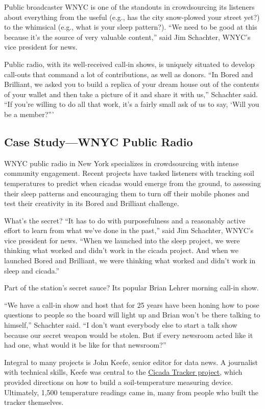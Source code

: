 \documentclass[notoc, symmetric, nobib, nols]{towcenter-guideto-book}
\begin{document}
Public broadcaster WNYC is one of the standouts in crowdsourcing its listeners about everything from the useful (e.g., has the city snow-plowed your street yet?) to the whimsical (e.g., what is your sleep pattern?).
``We need to be good at this because it's the source of very valuable content,'' said Jim Schachter, WNYC's vice president for news.%

Public radio, with its well-received call-in shows, is uniquely situated to develop call-outs that command a lot of contributions, as well as donors. ``In Bored and Brilliant, we asked you to build a replica of your dream house out of the contents of your wallet and then take a picture of it and share it with us,'' Schachter said. ``If you're willing to do all that work, it's a fairly small ask of us to say, ‘Will you be a member?'''


\subsection{Case Study---WNYC Public Radio}

WNYC public radio in New York specializes in crowdsourcing with intense community engagement. Recent projects have tasked listeners with tracking soil temperatures to predict when cicadas would emerge from the ground, to assessing their sleep patterns and encouraging them to turn off their mobile phones and test their creativity in its Bored and Brilliant challenge.

What's the secret? ``It has to do with purposefulness and a reasonably active effort to learn from what we've done in the past,'' said Jim Schachter, WNYC's vice president for news. ``When we launched into the sleep project, we were thinking what worked and didn't work in the cicada project. And when we launched Bored and Brilliant, we were thinking what worked and didn't work in sleep and cicada.''

Part of the station's secret sauce? Its popular Brian Lehrer morning call-in show. 

``We have a call-in show and host that for 25 years have been honing how to pose questions to people so the board will light up and Brian won't be there talking to himself,'' Schachter said. ``I don't want everybody else to start a talk show because our secret weapon would be stolen. But if every newsroom acted like it had one, what would it be like for that newsroom?''

Integral to many projects is John Keefe, senior editor for data news. A journalist with technical skills, Keefe was central to the \href{http://project.wnyc.org/cicadas/}{Cicada Tracker project}, which provided directions on how to build a soil-temperature measuring device.\autocite{Cicadas} Ultimately, 1,500 temperature readings came in, many from people who built the tracker themselves.%
\end{document}
